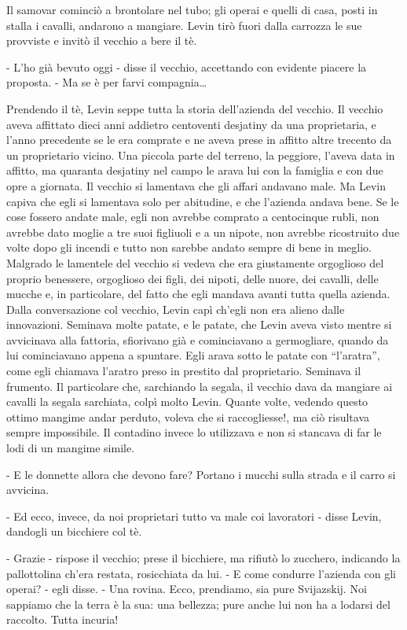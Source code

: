 Il samovar cominciò a brontolare nel tubo; gli operai e quelli di casa, posti in stalla i cavalli, andarono a mangiare. Levin tirò fuori dalla carrozza le sue provviste e invitò il vecchio a bere il tè. 

- L'ho già bevuto oggi - disse il vecchio, accettando con evidente piacere la proposta. - Ma se è per farvi compagnia\ldots{} 

Prendendo il tè, Levin seppe tutta la storia dell'azienda del vecchio. Il vecchio aveva affittato dieci anni addietro centoventi desjatiny da una proprietaria, e l'anno precedente se le era comprate e ne aveva prese in affitto altre trecento da un proprietario vicino. Una piccola parte del terreno, la peggiore, l'aveva data in affitto, ma quaranta desjatiny nel campo le arava lui con la famiglia e con due opre a giornata. Il vecchio si lamentava che gli affari andavano male. Ma Levin capiva che egli si lamentava solo per abitudine, e che l'azienda andava bene. Se le cose fossero andate male, egli non avrebbe comprato a centocinque rubli, non avrebbe dato moglie a tre suoi figliuoli e a un nipote, non avrebbe ricostruito due volte dopo gli incendi e tutto non sarebbe andato sempre di bene in meglio. Malgrado le lamentele del vecchio si vedeva che era giustamente orgoglioso del proprio benessere, orgoglioso dei figli, dei nipoti, delle nuore, dei cavalli, delle mucche e, in particolare, del fatto che egli mandava avanti tutta quella azienda. Dalla conversazione col vecchio, Levin capì ch'egli non era alieno dalle innovazioni. Seminava molte patate, e le patate, che Levin aveva visto mentre si avvicinava alla fattoria, sfiorivano già e cominciavano a germogliare, quando da lui cominciavano appena a spuntare. Egli arava sotto le patate con ``l'aratra'', come egli chiamava l'aratro preso in prestito dal proprietario. Seminava il frumento. Il particolare che, sarchiando la segala, il vecchio dava da mangiare ai cavalli la segala sarchiata, colpì molto Levin. Quante volte, vedendo questo ottimo mangime andar perduto, voleva che si raccogliesse!, ma ciò risultava sempre impossibile. Il contadino invece lo utilizzava e non si stancava di far le lodi di un mangime simile. 

- E le donnette allora che devono fare? Portano i mucchi sulla strada e il carro si avvicina. 

- Ed ecco, invece, da noi proprietari tutto va male coi lavoratori - disse Levin, dandogli un bicchiere col tè. 

- Grazie - rispose il vecchio; prese il bicchiere, ma rifiutò lo zucchero, indicando la pallottolina ch'era restata, rosicchiata da lui. - E come condurre l'azienda con gli operai? - egli disse. - Una rovina. Ecco, prendiamo, sia pure Svijazskij. Noi sappiamo che la terra è la sua: una bellezza; pure anche lui non ha a lodarsi del raccolto. Tutta incuria! 

